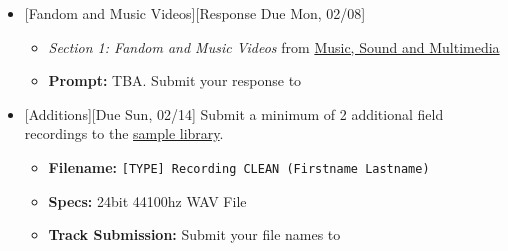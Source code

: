 \def\dMon{Mon, 02/08}
\def\dTues{Tues, 02/09}
\def\dWed{Wed, 02/10}
\def\dThur{Thur, 02/11}
\def\dFri{Fri, 02/12}
\def\dSat{Sat, 02/13}
\def\dSun{Sun, 02/14}
\placeDate

\begin{itemize}[noitemsep,topsep=0pt,leftmargin=*]
	\item {}[Fandom and Music Videos][Response Due \dMon]
	      \begin{itemize}
		      \item \emph{Section 1: Fandom and Music Videos} from \href{supplements/Music_Sound_and_Multimedia_-_From_the_Live_to_the_Virtual_(Music_and_the_Moving_Image)_(2008).pdf}{Music, Sound and Multimedia}
		      \item \textbf{Prompt:} TBA. Submit your response to \discordR
	      \end{itemize}
	\item {}[Additions][Due \dSun] \newline
	      Submit a minimum of 2 additional field recordings to the \href{\samplelibPermURL}{sample library}.
	      \begin{itemize}
		      \item \textbf{Filename:} \texttt{[TYPE] Recording CLEAN (Firstname Lastname)}
		      \item \textbf{Specs:} 24bit 44100hz WAV File
		      \item \textbf{Track Submission:} Submit your file names to \discordS
	      \end{itemize}
\end{itemize}